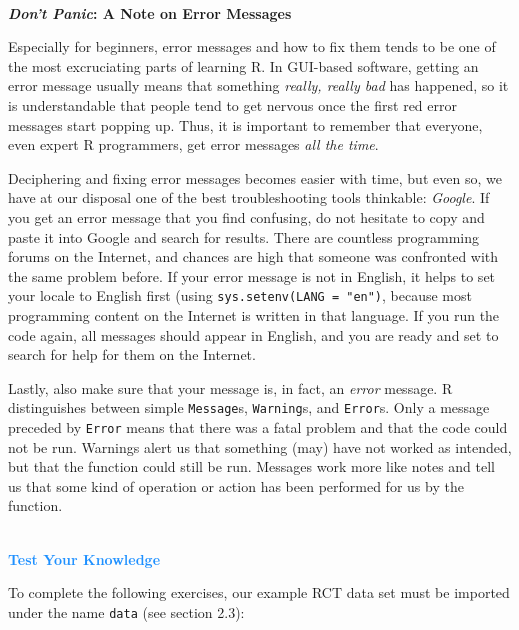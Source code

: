 \begin{box-important} \\
\textcolor{burgundyred}{\textbf{\emph{Don't Panic}: A Note on Error Messages}}

\vspace{2mm}

Especially for beginners, error messages and how to fix them tends to be one of the most excruciating parts of learning \textsf{R}. In GUI-based software, getting an error message usually means that something \emph{really, really bad} has happened, so it is understandable that people tend to get nervous once the first red error messages start popping up. Thus, it is important to remember that everyone, even expert \textsf{R} programmers, get error messages \emph{all the time}. 

\vspace{2mm}

\hspace*{5mm} Deciphering and fixing error messages becomes easier with time, but even so, we have at our disposal one of the best troubleshooting tools thinkable: \emph{Google}. If you get an error message that you find confusing, do not hesitate to copy and paste it into Google and search for results. There are countless programming forums on the Internet, and chances are high that someone was confronted with the same problem before. If your error message is not in English, it helps to set your locale to English first (using \texttt{sys.setenv(LANG = "en")}, because most programming content on the Internet is written in that language. If you run the code again, all messages should appear in English, and you are ready and set to search for help for them on the Internet. 

\vspace{2mm}

\hspace*{5mm} Lastly, also make sure that your message is, in fact, an \emph{error} message. \textsf{R} distinguishes between simple \texttt{Message}s, \texttt{Warning}s, and \texttt{Error}s. Only a message preceded by \texttt{Error} means that there was a fatal problem and that the code could not be run. Warnings alert us that something (may) have not worked as intended, but that the function could still be run. Messages work more like notes and tell us that some kind of operation or action has been performed for us by the function.
\end{box-important}

\begin{box-info} \\
\textcolor{dodgerblue}{\textbf{Test Your Knowledge}} 

\vspace{2mm}

To complete the following exercises, our example RCT data set must be imported under the name \texttt{data} (see section 2.3):
\end{box-info}

